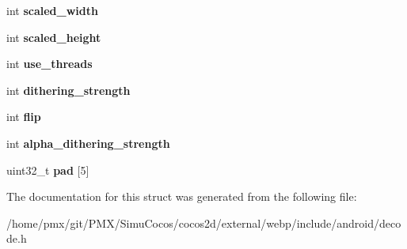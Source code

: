 \begin{DoxyCompactItemize}
int {\bfseries scaled\+\_\+width}
\item 
\mbox{\label{structWebPDecoderOptions_a5ab8c5c46589aaf86c084d341a77d03c}} 
int {\bfseries scaled\+\_\+height}
\item 
\mbox{\label{structWebPDecoderOptions_ae1c9cbad64a9a92823d1bc1d03318a52}} 
int {\bfseries use\+\_\+threads}
\item 
\mbox{\label{structWebPDecoderOptions_a95b1babff1cd4f4faf2142e4a02e03e1}} 
int {\bfseries dithering\+\_\+strength}
\item 
\mbox{\label{structWebPDecoderOptions_af0aad48dc78f4db143d32f6e2222a498}} 
int {\bfseries flip}
\item 
\mbox{\label{structWebPDecoderOptions_a8046519c2ccb8d48ef43580e1d318a42}} 
int {\bfseries alpha\+\_\+dithering\+\_\+strength}
\item 
\mbox{\label{structWebPDecoderOptions_a668544e4c89655db1a1c049f762c30eb}} 
uint32\+\_\+t {\bfseries pad} \mbox{[}5\mbox{]}
\end{DoxyCompactItemize}


The documentation for this struct was generated from the following file\+:\begin{DoxyCompactItemize}
\item 
/home/pmx/git/\+P\+M\+X/\+Simu\+Cocos/cocos2d/external/webp/include/android/decode.\+h\end{DoxyCompactItemize}
